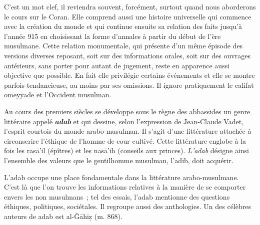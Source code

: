 
C'est un mot clef, il reviendra souvent, forcément, surtout quand nous
aborderons le cours sur le Coran. Elle comprend aussi une histoire
universelle qui commence avec la création du monde et qui continue
ensuite sa relation des faits jusqu'à l'année 915 en choisissant la
forme d'annales à partir du début de l'ère musulmane. Cette relation
monumentale, qui présente d'un même épisode des versions diverses
reposant, soit sur des informations orales, soit sur des ouvrages
antérieurs, sans porter pour autant de jugement, reste en apparence
aussi objective que possible. En fait elle privilégie certains
événements et elle se montre parfois tendancieuse, au moins par ses
omissions. Il ignore pratiquement le califat omeyyade et l'Occident
musulman.


Au cours des premiers siècles se développe sous le règne des abbassides
un genre littéraire appelé \emph{\textbf{adab}} et qui dessine, selon
l'expression de Jean-Claude Vadet, l'esprit courtois du monde
arabo-musulman. Il s'agit d'une littérature attachée à circonscrire
l'éthique de l'homme de cour cultivé. Cette littérature englobe à la
fois les rasā'il (épîtres) et les nasā'ih (conseils aux princes).
\emph{L'adab} désigne ainsi l'ensemble des valeurs que le gentilhomme
musulman, l'adīb, doit acquérir.

L'adab occupe une place fondamentale dans la littérature
arabo-musulmane. C'est là que l'on trouve les informations relatives à
la manière de se comporter envers les non musulmans~; tel des essais,
l'adab mentionne des questions éthiques, politiques, sociétales. Il
regroupe aussi des anthologies. Un des célèbres auteurs de adab est
al-Ǧāhiẓ (m. 868).

